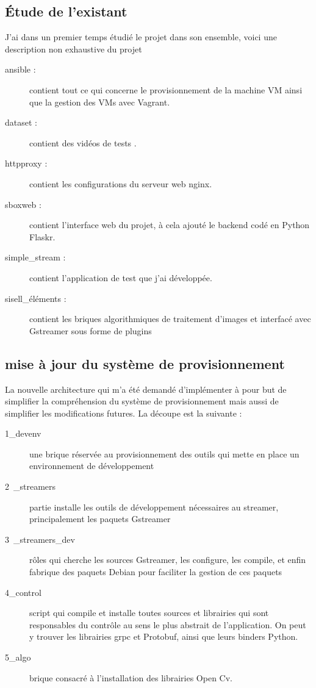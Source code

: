  \subsection{Étude de l'existant}
J'ai dans un premier temps étudié le projet dans son ensemble, voici une description non exhaustive du projet
  \begin{description}
   \item [ansible : ] contient tout ce qui concerne le provisionnement de la machine VM ainsi que la gestion des VMs avec Vagrant.
  \item [dataset : ] contient des vidéos de tests .
  \item [httpproxy : ] contient les configurations du serveur web nginx.
\item [sboxweb : ] contient l'interface web du projet, à cela ajouté le backend codé en Python Flaskr.
\item [simple\_stream : ] contient l'application de test que j'ai développée.
\item [sisell\_éléments : ] contient les briques algorithmiques de traitement d'images et interfacé avec Gstreamer sous forme de plugins
  \end{description}

 \subsection{mise à jour du système de provisionnement}
La nouvelle architecture qui m'a été demandé d'implémenter à pour but de simplifier la compréhension du système de provisionnement mais aussi de simplifier les modifications futures. La découpe est la suivante :
  \begin{description}
   \item [1\_devenv] une brique réservée au provisionnement des outils qui mette en place un environnement de développement
   \item [2 \_streamers] partie installe les outils de développement nécessaires au streamer, principalement les paquets Gstreamer
   \item [3 \_streamers\_dev] rôles qui cherche les sources Gstreamer, les configure, les compile, et enfin fabrique des paquets Debian pour faciliter la gestion de ces paquets
   \item [4\_control] script qui compile et installe toutes sources et librairies qui sont responsables du contrôle au sens le plus abstrait de l'application. On peut y trouver les librairies grpc et Protobuf, ainsi que leurs binders Python.
   \item [5\_algo] brique consacré à l'installation des librairies Open Cv.
  \end{description}

